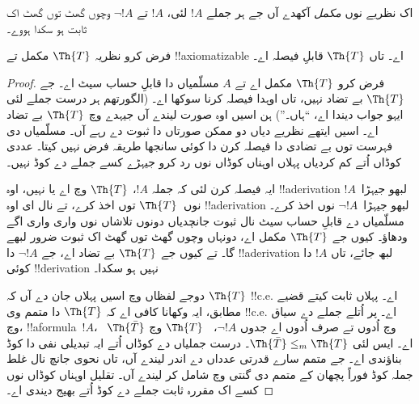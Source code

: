 \documentclass[../../../include/open-logic-section]{subfiles}
\begin{document}


اک نظریے نوں {\em مکمل} آکھدے آں جے ہر جملے $!A$ لئی،
$!A$ تے $\lnot !A$ وچوں گھٹ توں گھٹ اک ثابت ہو سکدا ہووے۔

\begin{lem}
فرض کرو نظریہ $\Th{T}$ مکمل تے !!{axiomatizable} اے۔
تاں $\Th{T}$ قابلِ فیصلہ اے۔
\end{lem}

\begin{proof}
فرض کرو $\Th{T}$ مکمل اے تے $A$ مسلّمیاں دا قابلِ حساب سیٹ اے۔
جے $\Th{T}$ بے تضاد نہیں، تاں اوہدا فیصلہ کرنا سوکھا اے۔
(الگورتھم ہر درست جملے لئی ایہو جواب دیندا اے، “ہاں۔”)
ہن اسیں اوہ صورت لیندے آں جیہدے وچ $\Th{T}$ بے تضاد اے۔
اسیں ایتھے نظریے دیاں دو ممکن صورتاں دا ثبوت دے رہے آں۔
مسلّمیاں دی فہرست توں بے تضادی دا فیصلہ کرن دا کوئی سانجھا
طریقہ فرض نہیں کیتا۔ عددی کوڈاں اُتے کم کردیاں پہلاں اوہناں
کوڈاں نوں رد کرو جیہڑے کسے جملے دے کوڈ نہیں۔

ایہ فیصلہ کرن لئی کہ جملہ $!A$، $\Th{T}$ وچ اے یا نہیں،
اوہ !!a{derivation} لبھو جیہڑا~$!A$ نوں~$\Th{T}$ توں اخذ
کرے، تے نال ای اوہ !!a{derivation} لبھو جیہڑا~$\lnot !A$ نوں
اخذ کرے۔ مسلّمیاں دے قابلِ حساب سیٹ نال ثبوت جانچدیاں دونوں
تلاشاں نوں واری واری اگے ودھاؤ۔ کیوں جے $\Th{T}$ مکمل اے،
دونہاں وچوں گھٹ توں گھٹ اک ثبوت ضرور لبھے گا۔ تے کیوں جے
$\Th{T}$ بے تضاد اے، جے $\lnot !A$ دا !!a{derivation} لبھ
جائے، تاں $!A$ دا کوئی !!{derivation} نہیں ہو سکدا۔

دوجے لفظاں وچ اسیں پہلاں جان دے آں کہ $\Th{T}$ !!{c.e.} اے۔
پہلاں ثابت کیتے قضیے مطابق، ایہ وکھانا کافی اے کہ $\Th{T}$ دا
متمم وی !!{c.e.} اے۔ پر اُتلے جملے دے سیاق وچ، !!a{formula}~$!A$،
~$\Th{\bar T}$ وچ اُدوں تے صرف اُدوں اے جدوں $\lnot !A$،
~$\Th{T}$ وچ اے۔ ایس لئی $\Th{\bar T} \leq_m \Th{T}$۔
درست جملیاں دے کوڈاں اُتے ایہ تبدیلی نفی دا کوڈ بناؤندی اے۔
جے متمم سارے قدرتی عدداں دے اندر لیندے آں، تاں نحوی جانچ نال
غلط جملہ کوڈ فوراً پچھان کے متمم دی گنتی وچ شامل کر لیندے آں۔
تقلیل اوہناں کوڈاں نوں کسے اک مقررہ ثابت جملے دے کوڈ اُتے
بھیج دیندی اے۔
\end{proof}
\end{document}
